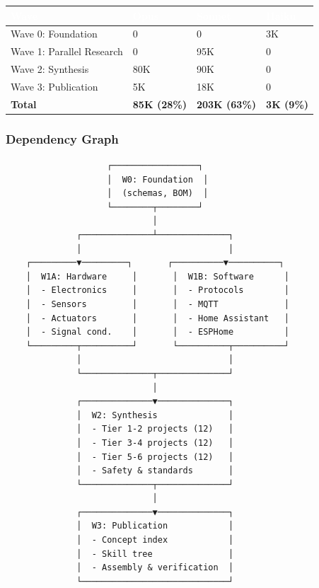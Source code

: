 \documentclass[11pt,letterpaper]{article}
\newcommand{\tableheader}[1]{\textbf{\sffamily\textcolor{white}{#1}}}
\begin{document}
\begin{center}
\begin{tabularx}{\textwidth}{L{4cm}C{2cm}C{2cm}C{2cm}}
\toprule
{}
\tableheader{Wave} & \tableheader{Opus} & \tableheader{Sonnet} & \tableheader{Haiku} \\
\midrule
Wave 0: Foundation & 0 & 0 & 3K \\
Wave 1: Parallel Research & 0 & 95K & 0 \\
Wave 2: Synthesis & 80K & 90K & 0 \\
Wave 3: Publication & 5K & 18K & 0 \\
\midrule
\textbf{Total} & \textbf{85K (28\%)} & \textbf{203K (63\%)} & \textbf{3K (9\%)} \\
\bottomrule
\end{tabularx}
\end{center}

\subsubsection{Dependency Graph}

\begin{asciibox}
\begin{verbatim}
                    ┌─────────────────┐
                    │  W0: Foundation  │
                    │  (schemas, BOM)  │
                    └────────┬────────┘
                             │
              ┌──────────────┴──────────────┐
              │                             │
    ┌─────────▼─────────┐       ┌──────────▼──────────┐
    │  W1A: Hardware     │       │  W1B: Software      │
    │  - Electronics     │       │  - Protocols        │
    │  - Sensors         │       │  - MQTT             │
    │  - Actuators       │       │  - Home Assistant   │
    │  - Signal cond.    │       │  - ESPHome          │
    └─────────┬──────────┘       └──────────┬──────────┘
              │                             │
              └──────────────┬──────────────┘
                             │
              ┌──────────────▼──────────────┐
              │  W2: Synthesis              │
              │  - Tier 1-2 projects (12)   │
              │  - Tier 3-4 projects (12)   │
              │  - Tier 5-6 projects (12)   │
              │  - Safety & standards       │
              └──────────────┬──────────────┘
                             │
              ┌──────────────▼──────────────┐
              │  W3: Publication            │
              │  - Concept index            │
              │  - Skill tree               │
              │  - Assembly & verification  │
              └─────────────────────────────┘
\end{verbatim}
\end{asciibox}
\end{document}
